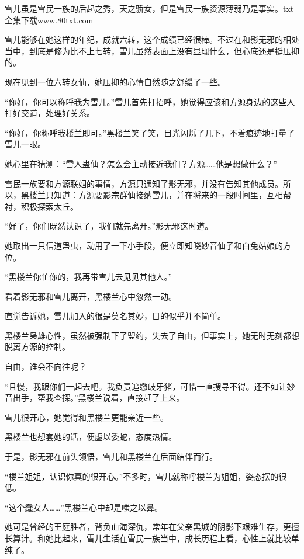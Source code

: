 
\begin{this_body}

雪儿虽是雪民一族的后起之秀，天之骄女，但是雪民一族资源薄弱乃是事实。txt全集下载www.80txt.com

雪儿能够在她这样的年纪，成就六转，这个成绩已经很棒。不过在和影无邪的相处当中，到底是修为比不上七转，雪儿虽然表面上没有显现什么，但心底还是挺压抑的。

现在见到一位六转女仙，她压抑的心情自然随之舒缓了一些。

“你好，你可以称呼我为雪儿。”雪儿首先打招呼，她觉得应该和方源身边的这些人打好交道，处理好关系。

“你好，你称呼我楼兰即可。”黑楼兰笑了笑，目光闪烁了几下，不着痕迹地打量了雪儿一眼。

她心里在猜测：“雪人蛊仙？怎么会主动接近我们？方源……他是想做什么？”

雪民一族要和方源联姻的事情，方源只通知了影无邪，并没有告知其他成员。所以，黑楼兰只知道：方源要影宗群仙接纳雪儿，并在将来的一段时间里，互相帮衬，积极探索太丘。

“好了，你们既然认识了，我们就先离开。”影无邪这时道。

她取出一只信道蛊虫，动用了一下小手段，便立即知晓妙音仙子和白兔姑娘的方位。

“黑楼兰你忙你的，我再带雪儿去见见其他人。”

看着影无邪和雪儿离开，黑楼兰心中忽然一动。

直觉告诉她，雪儿加入的很是莫名其妙，目的似乎并不简单。

黑楼兰枭雄心性，虽然被强制下了盟约，失去了自由，但事实上，她无时无刻都想脱离方源的控制。

自由，谁会不向往呢？

“且慢，我跟你们一起去吧。我负责追缴歧牙猪，可惜一直搜寻不得。还不如让妙音出手，帮我查探。”黑楼兰说着，直接赶了上来。

雪儿很开心，她觉得和黑楼兰更能亲近一些。

黑楼兰也想套她的话，便虚以委蛇，态度热情。

于是，影无邪在前头领悟，雪儿和黑楼兰在后面结伴而行。

“楼兰姐姐，认识你真的很开心。”不多时，雪儿就称呼楼兰为姐姐，姿态摆的很低。

“这个蠢女人……”黑楼兰心中却是嗤之以鼻。

她可是曾经的王庭胜者，背负血海深仇，常年在父亲黑城的阴影下艰难生存，更擅长算计。和她比起来，雪儿生活在雪民一族当中，成长历程上看，心性上就比较单纯了。


\end{this_body}
